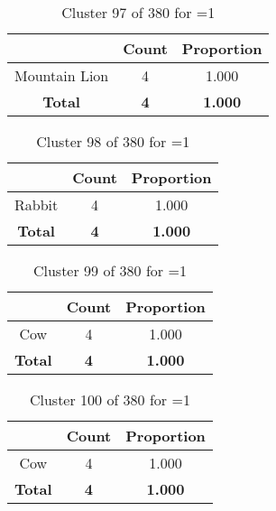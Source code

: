 \begin{table}[ht!]
\centering
\begin{tabular}{|c|c|c|}
\hline
\bf \Spec{} &\bf Count &\bf Proportion\\ \hline \hline
Mountain Lion & 4 & 1.000\\ \hline
\hline
\bf Total & \bf 4 & \bf 1.000\\ \hline
\end{tabular}
\label{tab:cluster:97:1}
\caption{Cluster 97 of 380 for \minneigh{}=1}
\end{table}

\begin{table}[ht!]
\centering
\begin{tabular}{|c|c|c|}
\hline
\bf \Spec{} &\bf Count &\bf Proportion\\ \hline \hline
Rabbit & 4 & 1.000\\ \hline
\hline
\bf Total & \bf 4 & \bf 1.000\\ \hline
\end{tabular}
\label{tab:cluster:98:1}
\caption{Cluster 98 of 380 for \minneigh{}=1}
\end{table}

\begin{table}[ht!]
\centering
\begin{tabular}{|c|c|c|}
\hline
\bf \Spec{} &\bf Count &\bf Proportion\\ \hline \hline
Cow & 4 & 1.000\\ \hline
\hline
\bf Total & \bf 4 & \bf 1.000\\ \hline
\end{tabular}
\label{tab:cluster:99:1}
\caption{Cluster 99 of 380 for \minneigh{}=1}
\end{table}

\clearpage
\begin{table}[ht!]
\centering
\begin{tabular}{|c|c|c|}
\hline
\bf \Spec{} &\bf Count &\bf Proportion\\ \hline \hline
Cow & 4 & 1.000\\ \hline
\hline
\bf Total & \bf 4 & \bf 1.000\\ \hline
\end{tabular}
\label{tab:cluster:100:1}
\caption{Cluster 100 of 380 for \minneigh{}=1}
\end{table}

